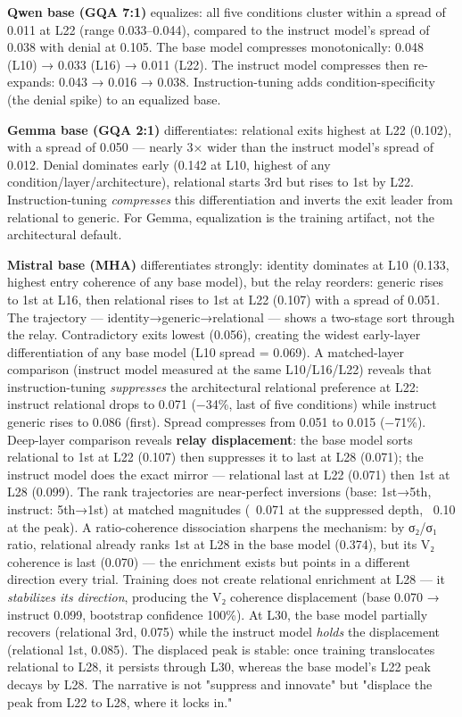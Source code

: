 \documentclass[12pt]{article}
\begin{document}
\textbf{Qwen base (GQA 7:1)} equalizes: all five conditions cluster within a spread of 0.011 at L22 (range 0.033–0.044), compared to the instruct model's spread of 0.038 with denial at 0.105. The base model compresses monotonically: 0.048 (L10) → 0.033 (L16) → 0.011 (L22). The instruct model compresses then re-expands: 0.043 → 0.016 → 0.038. Instruction-tuning adds condition-specificity (the denial spike) to an equalized base.

\textbf{Gemma base (GQA 2:1)} differentiates: relational exits highest at L22 (0.102), with a spread of 0.050 — nearly 3× wider than the instruct model's spread of 0.012. Denial dominates early (0.142 at L10, highest of any condition/layer/architecture), relational starts 3rd but rises to 1st by L22. Instruction-tuning \textit{compresses} this differentiation and inverts the exit leader from relational to generic. For Gemma, equalization is the training artifact, not the architectural default.

\textbf{Mistral base (MHA)} differentiates strongly: identity dominates at L10 (0.133, highest entry coherence of any base model), but the relay reorders: generic rises to 1st at L16, then relational rises to 1st at L22 (0.107) with a spread of 0.051. The trajectory — identity→generic→relational — shows a two-stage sort through the relay. Contradictory exits lowest (0.056), creating the widest early-layer differentiation of any base model (L10 spread = 0.069). A matched-layer comparison (instruct model measured at the same L10/L16/L22) reveals that instruction-tuning \textit{suppresses} the architectural relational preference at L22: instruct relational drops to 0.071 (−34\%, last of five conditions) while instruct generic rises to 0.086 (first). Spread compresses from 0.051 to 0.015 (−71\%). Deep-layer comparison reveals \textbf{relay displacement}: the base model sorts relational to 1st at L22 (0.107) then suppresses it to last at L28 (0.071); the instruct model does the exact mirror — relational last at L22 (0.071) then 1st at L28 (0.099). The rank trajectories are near-perfect inversions (base: 1st→5th, instruct: 5th→1st) at matched magnitudes (~0.071 at the suppressed depth, ~0.10 at the peak). A ratio-coherence dissociation sharpens the mechanism: by σ₂/σ₁ ratio, relational already ranks 1st at L28 in the base model (0.374), but its V₂ coherence is last (0.070) — the enrichment exists but points in a different direction every trial. Training does not create relational enrichment at L28 — it \textit{stabilizes its direction}, producing the V₂ coherence displacement (base 0.070 → instruct 0.099, bootstrap confidence 100\%). At L30, the base model partially recovers (relational 3rd, 0.075) while the instruct model \textit{holds} the displacement (relational 1st, 0.085). The displaced peak is stable: once training translocates relational to L28, it persists through L30, whereas the base model's L22 peak decays by L28. The narrative is not "suppress and innovate" but "displace the peak from L22 to L28, where it locks in."
\end{document}
